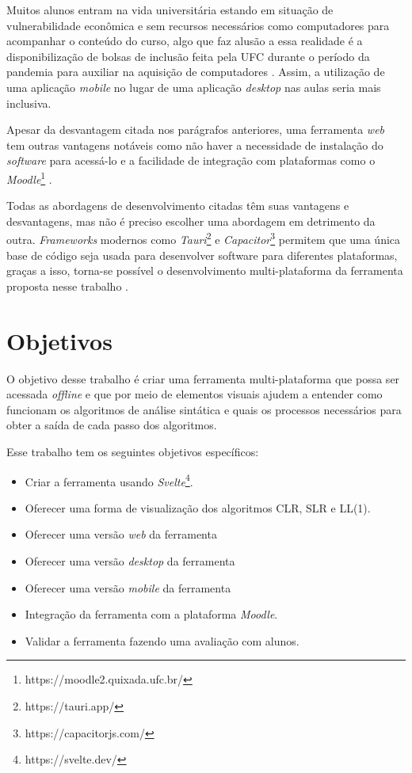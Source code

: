 Muitos alunos entram na vida universitária estando em situação de vulnerabilidade econômica e sem recursos necessários como computadores para acompanhar o conteúdo do curso, algo que faz alusão a essa realidade é a disponibilização de bolsas de inclusão feita pela UFC durante o período da pandemia para auxiliar na aquisição de computadores \cite{povo_ufc_2020}. Assim, a utilização de uma aplicação \textit{mobile} no lugar de uma aplicação \textit{desktop} nas aulas seria mais inclusiva.

Apesar da desvantagem citada nos parágrafos anteriores, uma ferramenta \textit{web} tem outras vantagens notáveis como não haver a necessidade de instalação do \textit{software} para acessá-lo e a facilidade de integração com plataformas como o \textit{Moodle}\footnote{https://moodle2.quixada.ufc.br/} \cite{desai_web_2022}.

Todas as abordagens de desenvolvimento citadas têm suas vantagens e desvantagens, mas não é preciso  escolher uma abordagem em detrimento da outra. \textit{Frameworks} modernos como \textit{Tauri}\footnote{https://tauri.app/} e \textit{Capacitor}\footnote{https://capacitorjs.com/} permitem que uma única base de código seja usada para desenvolver software para diferentes plataformas, graças a isso, torna-se possível o desenvolvimento multi-plataforma da ferramenta proposta nesse trabalho \cite{shevtsiv2021cross}.

\section{Objetivos}
O objetivo desse trabalho é criar uma ferramenta multi-plataforma que possa ser acessada \textit{offline} e que por meio de elementos visuais ajudem a entender como funcionam os algoritmos de análise sintática e quais os processos necessários para obter a saída de cada passo dos algoritmos.

Esse trabalho tem os seguintes objetivos específicos:
\begin{itemize}[label=$\sbullet$]
    \item Criar a ferramenta usando \textit{Svelte}\footnote{https://svelte.dev/}.
    \item Oferecer uma forma de visualização dos algoritmos CLR, SLR e LL(1).
    \item Oferecer uma versão \textit{web} da ferramenta
    \item Oferecer uma versão \textit{desktop} da ferramenta
    \item Oferecer uma versão \textit{mobile} da ferramenta
    \item Integração da ferramenta com a plataforma \textit{Moodle}.
    \item Validar a ferramenta fazendo uma avaliação com alunos.
\end{itemize}

